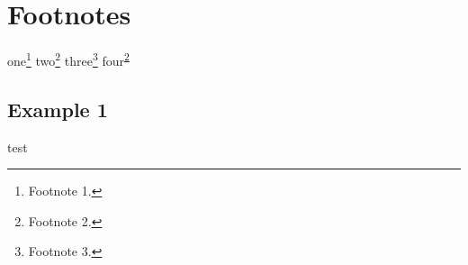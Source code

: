 \chapter{Footnotes}

one\footnote{\label{foot-1}Footnote 1.}
two\footnote{\label{foot-2}Footnote 2.}
three\footnote{\label{foot-3}Footnote 3.}
four\textsuperscript{\ref{foot-2}}

\section{Example 1}
test